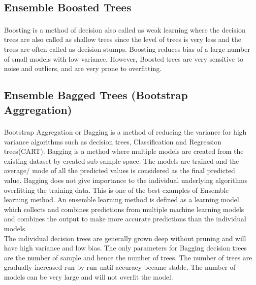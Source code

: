 \documentclass[journal, a4paper]{IEEEtran}
\begin{document}
\subsection{Ensemble Boosted Trees}
Boosting\textsuperscript{\cite{BoostedTrees}} is a method of decision also called as weak learning where the decision trees are also called as shallow trees since the level of trees is very less and the trees are often called as decision stumps. Boosting reduces bias of a large number of small models with low variance. However, Boosted trees are very sensitive to noise and outliers, and are very prone to overfitting.

\subsection{Ensemble Bagged Trees (Bootstrap Aggregation)}
Bootstrap Aggregation\textsuperscript{\cite{bootstrapAggregation}} or Bagging is a method of reducing the variance for high variance algorithms such as decision trees, Classification and Regression trees(CART). Bagging is a method where multiple models are created from the existing dataset by created sub-sample space. The models are trained and the average/ mode of all the predicted values is considered as the final predicted value. Bagging does not give importance to the individual underlying algorithms overfitting the training data. This is one of the best examples of Ensemble learning method. An ensemble learning method is defined as a learning model which collects and combines predictions from multiple machine learning models and combines the output to make more accurate predictions than the individual models. \\
\indent The individual decision trees are generally grown deep without pruning and will have high variance and low bias. The only parameters for Bagging decision trees are the number of sample and hence the number of trees. The number of trees are gradually increased run-by-run until accuracy became stable. The number of models can be very large and will not overfit the model.
\end{document}
